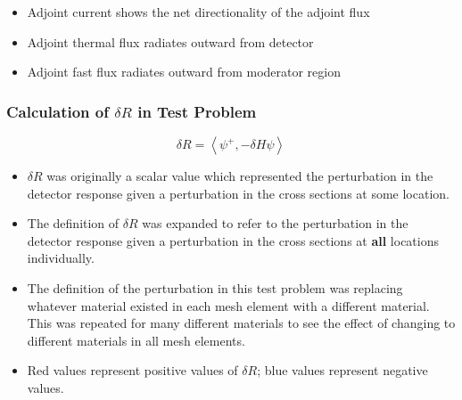 \documentclass[t]{beamer}
\begin{document}
\begin{frame}
\begin{columns}
\begin{figure}
    \end{figure}
  \end{columns}
  \begin{itemize}
    \item Adjoint current shows the net directionality of the adjoint flux
    \item Adjoint thermal flux radiates outward from detector
    \item Adjoint fast flux radiates outward from moderator region
  \end{itemize}
\end{frame}


\begin{frame}
  \frametitle{Calculation of $\delta R$ in Test Problem}
  \vskip-0.1in
  \begin{equation*}
    \delta R = \left<\psi^+,-\delta H\psi\right>
  \end{equation*}
  \vskip-0.1in
  \begin{itemize}
    \item $\delta R$ was originally a scalar value which represented the
          perturbation in the detector response given a perturbation in the
          cross sections at some location.
    \item The definition of $\delta R$ was expanded to refer to the
          perturbation in the detector response given a perturbation in the
          cross sections at \textbf{all} locations individually.
    \item The definition of the perturbation in this test problem was replacing
          whatever material existed in each mesh element with a different
          material. This was repeated for many different materials to see the
          effect of changing to different materials in all mesh elements.
    \item Red values represent positive values of $\delta R$; blue values
          represent negative values.
  \end{itemize}
\end{frame}
\end{document}
